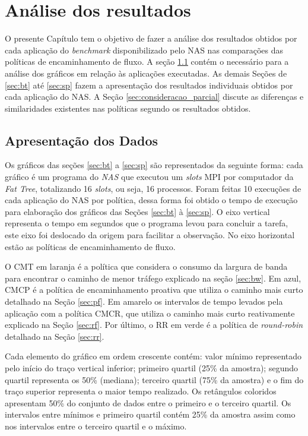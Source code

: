 \chapter{Análise dos resultados}
\label{cap:analise_resultados}
O presente Capítulo tem o objetivo de fazer a análise dos resultados obtidos por cada aplicação do \textit{benchmark} disponibilizado pelo NAS nas comparações das políticas de encaminhamento de fluxo.
A seção \ref{sec:aprentacao_dados} contém o necessário para a análise dos gráficos em relação às aplicações executadas. As demais Seções de \ref{sec:bt} até \ref{sec:sp} fazem a apresentação dos resultados individuais obtidos por cada aplicação do NAS. A Seção \ref{sec:consideracao_parcial} discute as diferenças e similaridades existentes nas políticas segundo os resultados obtidos.

\section{Apresentação dos Dados}
\label{sec:aprentacao_dados}

Os gráficos das seções \ref{sec:bt} a \ref{sec:sp} são representados da seguinte forma: cada gráfico é um programa do \emph{NAS} que executou um \emph{slots} MPI por computador da \emph{Fat Tree}, totalizando 16 \emph{slots}, ou seja, 16 processos. Foram feitas 10 execuções de cada aplicação do NAS por política, dessa forma foi obtido o tempo de execução para elaboração dos gráficos das Seções \ref{sec:bt} à \ref{sec:sp}. O eixo vertical representa o tempo em segundos que o programa levou para concluir a tarefa, este eixo foi deslocado da origem para facilitar a observação. No eixo horizontal estão as políticas de encaminhamento de fluxo. 

O CMT em laranja é a política que considera o consumo da largura de banda para encontrar o caminho de menor tráfego explicado na seção \ref{sec:bw}. Em azul, CMCP é a política de encaminhamento proativa que utiliza o caminho mais curto detalhado na Seção \ref{sec:pf}. Em amarelo os intervalos de tempo levados pela aplicação com a política CMCR, que utiliza o caminho mais curto reativamente explicado na Seção \ref{sec:rf}. Por último, o RR em verde é a política de \emph{round-robin} detalhado na Seção \ref{sec:rr}.

Cada elemento do gráfico em ordem crescente contém: valor mínimo representado pelo início do traço vertical inferior; primeiro quartil (25\% da amostra); segundo quartil representa os 50\% (mediana); terceiro quartil (75\% da amostra) e o fim do traço superior representa o maior tempo realizado. Os retângulos coloridos apresentam 50\% do conjunto de dados entre o primeiro e o terceiro quartil. Os intervalos entre mínimos e primeiro quartil contém 25\% da amostra assim como nos intervalos entre o terceiro quartil e o máximo.

